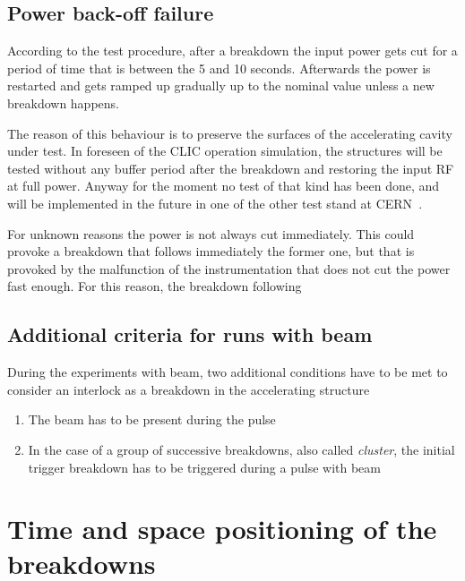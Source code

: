 \subsection{Power back-off failure}

According to the test procedure, after a breakdown the input power gets cut for a period of time that is between the 5 and 10 seconds. Afterwards the power is restarted and gets ramped up gradually up to the nominal value unless a new breakdown happens.

The reason of this behaviour is to preserve the surfaces of the accelerating cavity under test. In foreseen of the CLIC operation simulation, the structures will be tested without any buffer period after the breakdown and restoring the input RF at full power. Anyway for the moment no test of that kind has been done, and will be implemented in the future in one of the other test stand at CERN~\cite{Walter:PC}.

For unknown reasons the power is not always cut immediately. This could provoke a breakdown that follows immediately the former one, but that is provoked by the malfunction of the instrumentation that does not cut the power fast enough. For this reason, the breakdown following 






\subsection[Additional criteria for runs with beam]{Additional criteria for runs with beam}

During the experiments with beam, two additional conditions have to be met to consider an interlock as a breakdown in the accelerating structure
\begin{enumerate}
\item The beam has to be present during the pulse
\item In the case of a group of successive breakdowns, also called \textit{cluster}, the initial trigger breakdown has to be triggered during a pulse with beam
\end{enumerate}





\section[Time and space positioning of the breakdowns]{Time and space positioning of the breakdowns}

